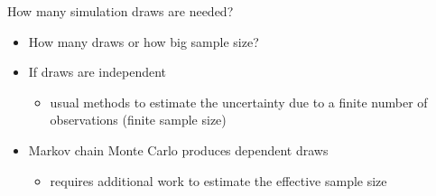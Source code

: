 \documentclass[english,t]{beamer}
\renewcommand{\emph}[1]{\textcolor{navyblue}{#1}}
\begin{document}
\begin{frame}
{How many simulation draws are needed?}

  \begin{itemize}
  \item How many draws or how big sample size?
  \item If draws are independent
    \begin{itemize}
    \item usual methods to estimate the uncertainty due to a finite
      number of observations (finite sample size)
    \end{itemize}
  \item Markov chain Monte Carlo produces dependent draws
    \begin{itemize}
    \item requires additional work to estimate the \emph{effective
        sample size}
    \end{itemize}
  \end{itemize}

\end{frame}
\end{document}
